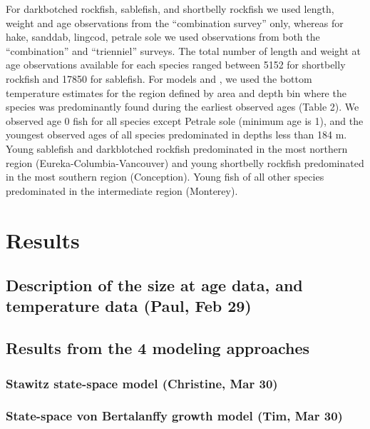 \documentclass[]{article}
\begin{document}
For darkbotched rockfish, sablefish, and shortbelly rockfish we used
length, weight and age observations from the ``combination survey''
only, whereas for hake, sanddab, lingcod, petrale sole we used
observations from both the ``combination'' and ``trienniel'' surveys.
The total number of length and weight at age observations available for
each species ranged between 5152 for shortbelly rockfish and 17850 for
sablefish. For models and , we used the bottom temperature estimates for
the region defined by area and depth bin where the species was
predominantly found during the earliest observed ages (Table 2). We
observed age 0 fish for all species except Petrale sole (minimum age is
1), and the youngest observed ages of all species predominated in depths
less than 184 m. Young sablefish and darkblotched rockfish predominated
in the most northern region (Eureka-Columbia-Vancouver) and young
shortbelly rockfish predominated in the most southern region
(Conception). Young fish of all other species predominated in the
intermediate region (Monterey).

\hypertarget{results}{%
\section{Results}\label{results}}

\hypertarget{description-of-the-size-at-age-data-and-temperature-data-paul-feb-29}{%
\subsection{Description of the size at age data, and temperature data
(Paul, Feb
29)}\label{description-of-the-size-at-age-data-and-temperature-data-paul-feb-29}}

\hypertarget{results-from-the-4-modeling-approaches}{%
\subsection{Results from the 4 modeling
approaches}\label{results-from-the-4-modeling-approaches}}

\hypertarget{stawitz-state-space-model-christine-mar-30}{%
\subsubsection{Stawitz state-space model (Christine, Mar
30)}\label{stawitz-state-space-model-christine-mar-30}}

\hypertarget{state-space-von-bertalanffy-growth-model-tim-mar-30}{%
\subsubsection{State-space von Bertalanffy growth model (Tim, Mar
30)}\label{state-space-von-bertalanffy-growth-model-tim-mar-30}}
\end{document}
